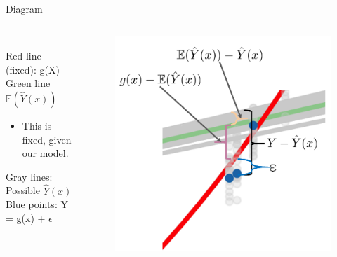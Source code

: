 \documentclass[aspectratio=169]{../latex_main/tntbeamer}  %
\begin{document}
	\begin{frame}[c]{Diagram}
	  \begin{columns}
	     
	      
	      \begin{column}{.4\textwidth}
	      \\
	      \bigskip
	      \bigskip
	      \bigskip
	          Red line (fixed): g(X)\\
	          Green line $\mathbb{E}(\hat{Y}(x))$
	          \begin{itemize}
	              \item This is fixed, given our model.
	          \end{itemize}
	          Gray lines: Possible $\hat{Y}(x)$\\
	          Blue points: Y = g(x) + $\epsilon$
	      \end{column}
	      
	      
	       \begin{column}{.6\textwidth}
	           \begin{figure}
	               \includegraphics[scale=.3]{Bild13}
	           \end{figure} 
	      \end{column}
	  \end{columns}
	\end{frame}
\end{document}
